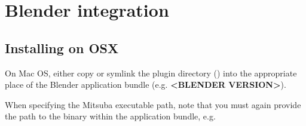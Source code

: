 \section{Blender integration}
\subsection{Installing on OSX}
On Mac OS, either copy or symlink the plugin directory () into the appropriate place of the
Blender application bundle (e.g. \textbf{<BLENDER VERSION>}).

When specifying the Mitsuba executable path, note that you must again provide
the path to the binary within the application bundle, e.g. 
